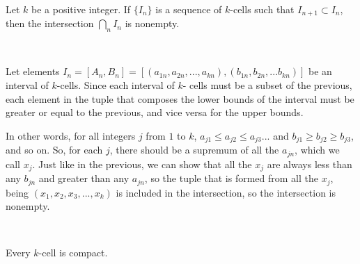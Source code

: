 \documentclass{article}
\begin{document}
\begin{theorem}
\

Let $k$ be a positive integer. If $\{I_n\}$ is a sequence of $k$-cells such that $I_{n+1} \subset I_n$, then the intersection $\bigcap_n I_n$ is nonempty.
\end{theorem}

\begin{customproof}
\

Let elements $I_n = [A_n, B_n]=[(a_{1n}, a_{2n}, ... , a_{kn}), (b_{1n}, b_{2n}, ... b_{kn})]$ be an interval of $k$-cells. Since each interval of $k$- cells must be a subset of the previous, each element in the tuple that composes the lower bounds of the interval must be greater or equal to the previous, and vice versa for the upper bounds.

In other words, for all integers $j$ from $1$ to $k$, $a_{j1} \leq a_{j2} \leq a_{j3} ... $ and $b_{j1} \geq b_{j2} \geq b_{j3}$, and so on. So, for each $j$, there should be a supremum of all the $a_{jn}$, which we call $x_j$. Just like in the previous, we can show that all the $x_j$ are always less than any $b_{jn}$ and greater than any $a_{jn}$, so the tuple that is formed from all the $x_j$, being $(x_1, x_2, x_3, ... , x_k)$ is included in the intersection, so the intersection is nonempty.
 \end{customproof}

\begin{theorem}
\

Every $k$-cell is compact.
\end{theorem}
\end{document}
